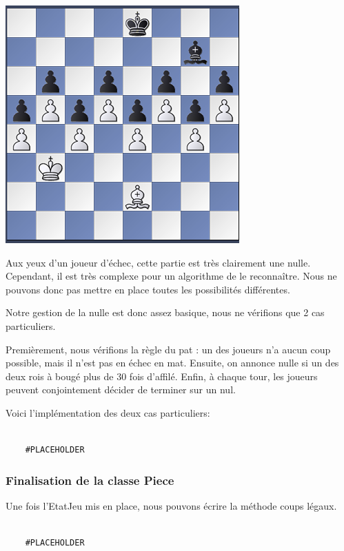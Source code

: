 \documentclass{article}
\begin{document}
\includegraphics{exempledraw}

Aux yeux d'un joueur d'échec, cette partie est très clairement une nulle.
Cependant, il est très complexe pour un algorithme de le reconnaître.
Nous ne pouvons donc pas mettre en place toutes les possibilités différentes.

Notre gestion de la nulle est donc assez basique, nous ne vérifions que 2 cas particuliers.

Premièrement, nous vérifions la règle du pat : un des joueurs n'a aucun coup possible, mais il n'est pas en échec en mat.
Ensuite, on annonce nulle si un des deux rois à bougé plus de 30 fois d'affilé.
Enfin, à chaque tour, les joueurs peuvent conjointement décider de terminer sur un nul.
 
Voici l'implémentation des deux cas particuliers: 
\begin{verbatim}

    #PLACEHOLDER
\end{verbatim}


\subsubsection{Finalisation de la classe Piece}
Une fois l'EtatJeu mis en place, nous pouvons écrire la méthode coups légaux.

\begin{verbatim}

    #PLACEHOLDER
\end{verbatim}
\end{document}
